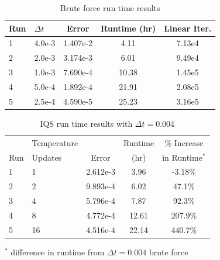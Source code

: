 \documentclass{anstrans}
\begin{document}
\begin{table}[!htbp]
\begin{center}
\begin{tabular}{|l|l|ccc|}
\hline
Run  &  $\Delta t$ & Error & Runtime (hr) & Linear Iter.\\
\hline
1	& 4.0e-3	& 1.407e-2 	& 4.11	& 7.13e4	\\
2	& 2.0e-3	& 3.174e-3 	& 6.01	& 9.49e4 	\\
3 	& 1.0e-3 	& 7.690e-4 	& 10.38	& 1.45e5	\\
4 	& 5.0e-4 	& 1.892e-4 	& 21.91	& 2.08e5	\\
5 	& 2.5e-4	& 4.590e-5 	& 25.23	& 3.16e5	\\
\hline
\end{tabular}
\end{center}
\caption{Brute force run time results}
\label{tab:ndiff_lra}
\end{table}

\begin{table}[!htbp]
\begin{center}
\begin{tabular}{|l|l|ccc|}
\hline
	&  Temperature 	&  		& Runtime 	& \% Increase	\\
Run	&  Updates 	& Error & (hr)		& in Runtime$^*$\\
\hline
1	& 1		& 2.612e-3 	& 3.96 	& -3.18\%	\\
2	& 2		& 9.893e-4 	& 6.02	&  47.1\%	\\
3 	& 4 	& 5.796e-4 	& 7.87	&  92.3\%	\\
4 	& 8 	& 4.772e-4 	& 12.61	& 207.9\% 	\\
5 	& 16	& 4.516e-4 	& 22.14	& 440.7\%	\\
\hline
\end{tabular}
\end{center}
\vspace{-3mm}
$^*$ difference in runtime from $\Delta t = 0.004$ brute force 
\caption{IQS run time results with $\Delta t = 0.004$}
\label{tab:iqs_lra}
\end{table}
\end{document}
